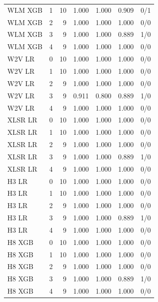 \documentclass[10pt,a4paper]{article}
\begin{document}
\begin{center}
\begin{longtable}{lrrrrrl}
WLM XGB & 1 & 10 & 1.000 & 1.000 & 0.909 & 0/1\\
WLM XGB & 2 & 9 & 1.000 & 1.000 & 1.000 & 0/0\\
WLM XGB & 3 & 9 & 1.000 & 1.000 & 0.889 & 1/0\\
WLM XGB & 4 & 9 & 1.000 & 1.000 & 1.000 & 0/0\\
W2V LR & 0 & 10 & 1.000 & 1.000 & 1.000 & 0/0\\
W2V LR & 1 & 10 & 1.000 & 1.000 & 1.000 & 0/0\\
W2V LR & 2 & 9 & 1.000 & 1.000 & 1.000 & 0/0\\
W2V LR & 3 & 9 & 0.911 & 0.800 & 0.889 & 1/0\\
W2V LR & 4 & 9 & 1.000 & 1.000 & 1.000 & 0/0\\
XLSR LR & 0 & 10 & 1.000 & 1.000 & 1.000 & 0/0\\
XLSR LR & 1 & 10 & 1.000 & 1.000 & 1.000 & 0/0\\
XLSR LR & 2 & 9 & 1.000 & 1.000 & 1.000 & 0/0\\
XLSR LR & 3 & 9 & 1.000 & 1.000 & 0.889 & 1/0\\
XLSR LR & 4 & 9 & 1.000 & 1.000 & 1.000 & 0/0\\
H3 LR & 0 & 10 & 1.000 & 1.000 & 1.000 & 0/0\\
H3 LR & 1 & 10 & 1.000 & 1.000 & 1.000 & 0/0\\
H3 LR & 2 & 9 & 1.000 & 1.000 & 1.000 & 0/0\\
H3 LR & 3 & 9 & 1.000 & 1.000 & 0.889 & 1/0\\
H3 LR & 4 & 9 & 1.000 & 1.000 & 1.000 & 0/0\\
H8 XGB & 0 & 10 & 1.000 & 1.000 & 1.000 & 0/0\\
H8 XGB & 1 & 10 & 1.000 & 1.000 & 1.000 & 0/0\\
H8 XGB & 2 & 9 & 1.000 & 1.000 & 1.000 & 0/0\\
H8 XGB & 3 & 9 & 1.000 & 1.000 & 0.889 & 1/0\\
H8 XGB & 4 & 9 & 1.000 & 1.000 & 1.000 & 0/0\\
\end{longtable}\end{center}
\end{document}
